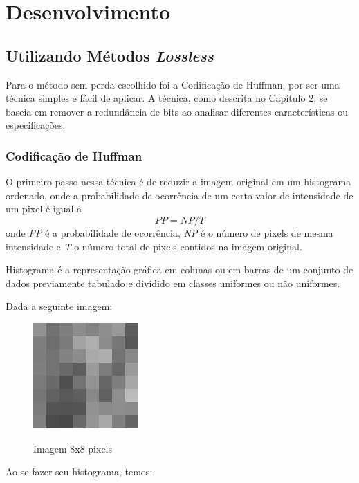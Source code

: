 \chapter{Desenvolvimento}
\label{c.desenvolvimento}

\section{Utilizando Métodos {\em Lossless}}
\label{s.losslessdev}

Para o método sem perda escolhido foi a Codificação de Huffman, por ser uma técnica simples e fácil de aplicar. A técnica, como descrita no Capítulo 2, se baseia em remover a redundância de bits ao analisar diferentes características ou especificações.

\subsection{Codificação de Huffman}
\label{ss.huffmandev}

O primeiro passo nessa técnica é de reduzir a imagem original em um histograma ordenado, onde a probabilidade de ocorrência de um certo valor de intensidade de um pixel é igual a \[ PP = NP / T \] onde {\em PP} é a probabilidade de ocorrência, {\em NP} é o número de pixels de mesma intensidade e {\em T} o número total de pixels contidos na imagem original.

Histograma é a representação gráfica em colunas ou em barras de um conjunto de dados previamente tabulado e dividido em classes uniformes ou não uniformes.

Dada a seguinte imagem:

\begin{figure}[h]
\caption{\small Imagem 8x8 pixels}
\centering
\includegraphics[scale=0.50]{figs/Input-Image-1.png}
\label{f.imagecompressionbasics}
\end{figure}

Ao se fazer seu histograma, temos:

